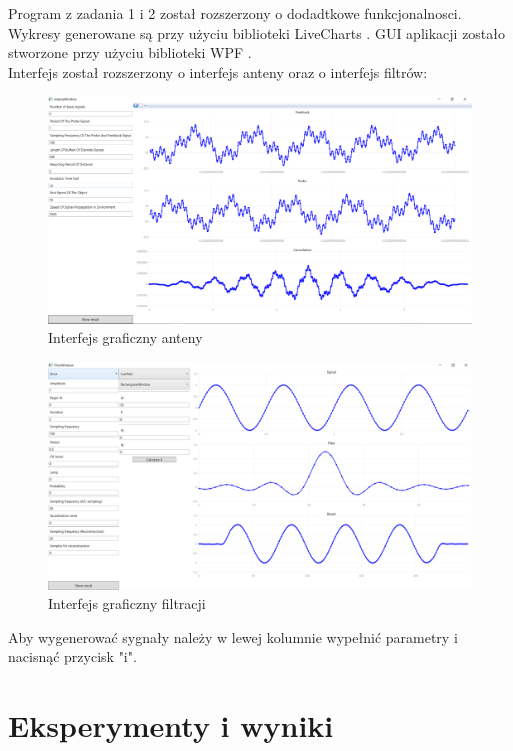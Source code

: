 \documentclass[12pt]{article}
\begin{document}
Program z zadania 1 i 2 został rozszerzony o dodadtkowe funkcjonalnosci. Wykresy generowane są przy użyciu biblioteki LiveCharts \cite{lv}. GUI aplikacji zostało stworzone przy użyciu biblioteki WPF \cite{wpf}.
\\Interfejs został rozszerzony o interfejs anteny oraz o interfejs filtrów:
\begin{figure}[H]
 \centering
 \includegraphics[width=15cm]{images/antenaWindow.PNG}
 \vspace{-0.3cm}
 \caption{Interfejs graficzny anteny}
 \label{gui}
\end{figure}
\begin{figure}[H]
 \centering
 \includegraphics[width=15cm]{images/filterWindow.PNG}
 \vspace{-0.3cm}
 \caption{Interfejs graficzny filtracji}
 \label{gui}
\end{figure}


Aby wygenerować sygnały należy w lewej kolumnie wypełnić parametry i nacisnąć przycisk "i". 
\section{Eksperymenty i wyniki}
\end{document}
